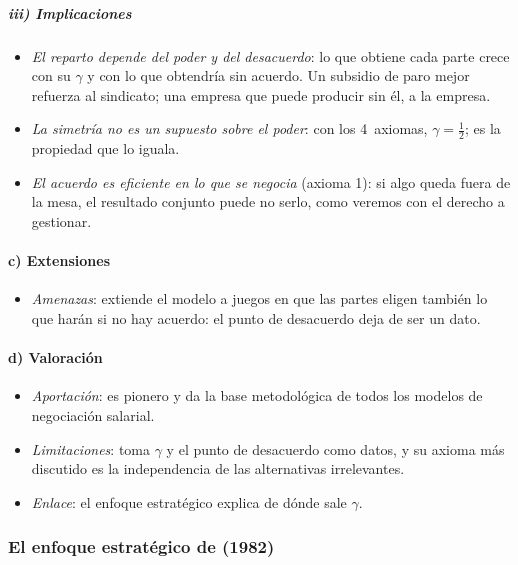 \documentclass[11pt]{article}
\begin{document}
\subparagraph{iii) Implicaciones}

\begin{itemize}
\item \emph{El reparto depende del poder y del desacuerdo}: lo que obtiene cada parte crece con su $\gamma$ y con lo que obtendría sin acuerdo. Un subsidio de paro mejor refuerza al sindicato; una empresa que puede producir sin él, a la empresa.
\item \emph{La simetría no es un supuesto sobre el poder}: con los 4~axiomas, $\gamma=\tfrac{1}{2}$; es la propiedad que lo iguala.
\item \emph{El acuerdo es eficiente en lo que se negocia} (axioma 1): si algo queda fuera de la mesa, el resultado conjunto puede no serlo, como veremos con el derecho a gestionar.
\end{itemize}

\paragraph{c) Extensiones}

\begin{itemize}
\item \emph{Amenazas}: \textcite{Nash1953TwoPerson} extiende el modelo a juegos en que las partes eligen también lo que harán si no hay acuerdo: el punto de desacuerdo deja de ser un dato.
\end{itemize}

\paragraph{d) Valoración}

\begin{itemize}
\item \emph{Aportación}: es pionero y da la base metodológica de todos los modelos de negociación salarial.
\item \emph{Limitaciones}: toma $\gamma$ y el punto de desacuerdo como datos, y su axioma más discutido es la independencia de las alternativas irrelevantes\nocite{OsborneRubinstein1990Bargaining,MasColellWhinstonGreen1995}.
\item \emph{Enlace}: el enfoque estratégico explica de dónde sale $\gamma$.
\end{itemize}

\subsubsection{El enfoque estratégico de  (1982)}\label{sec:rubinstein}
\end{document}
